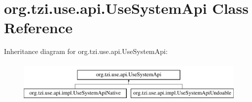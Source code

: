 \hypertarget{classorg_1_1tzi_1_1use_1_1api_1_1_use_system_api}{\section{org.\-tzi.\-use.\-api.\-Use\-System\-Api Class Reference}
\label{classorg_1_1tzi_1_1use_1_1api_1_1_use_system_api}
}
Inheritance diagram for org.\-tzi.\-use.\-api.\-Use\-System\-Api\-:\begin{figure}[H]
\begin{center}
\leavevmode
\includegraphics[height=2.000000cm]{classorg_1_1tzi_1_1use_1_1api_1_1_use_system_api}
\end{center}
\end{figure}
